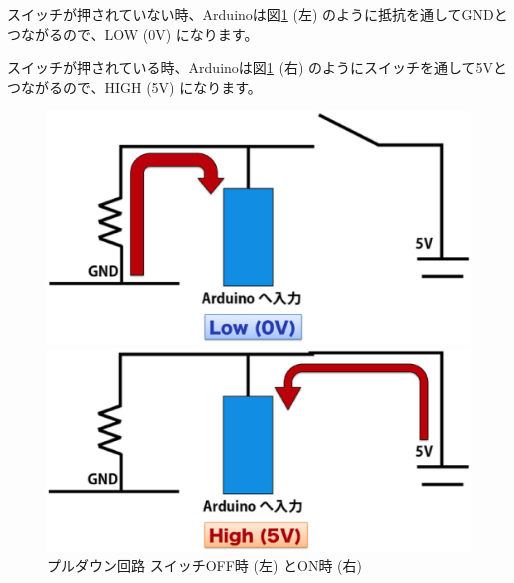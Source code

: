 \documentclass[11pt,a4paper]{jarticle}
\begin{document}
 スイッチが押されていない時、Arduinoは図\ref{fig:pulldown} (左) のように抵抗を通してGNDとつながるので、LOW (0V) になります。
 
 スイッチが押されている時、Arduinoは図\ref{fig:pulldown} (右) のようにスイッチを通して5Vとつながるので、HIGH (5V) になります。

 \begin{figure}[htbp]
  \begin{minipage}{0.5\columnwidth}
   \centering
   \includegraphics[width=0.8\columnwidth]{img/pulldown_off.eps}
  \end{minipage}
  \begin{minipage}{0.5\columnwidth}
   \includegraphics[width=0.8\columnwidth]{img/pulldown_on.eps}
  \end{minipage}
  \caption{プルダウン回路 スイッチOFF時 (左) とON時 (右)  }
  \label{fig:pulldown}
\end{figure}

\end{document}
